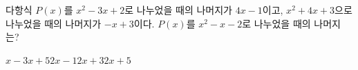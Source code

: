 다항식 $P(x)$를 $x^2-3x+2$로 나누었을 때의 나머지가 $4x-1$이고, $x^2+4x+3$으로 나누었을 때의 나머지가 $-x+3$이다. $P(x)$를 $x^2-x-2$로 나누었을 때의 나머지는?
\begin{choices32}{$x-3$}{$x+5$}{$2x-1$}{$2x+3$}{$2x+5$}\end{choices32}
